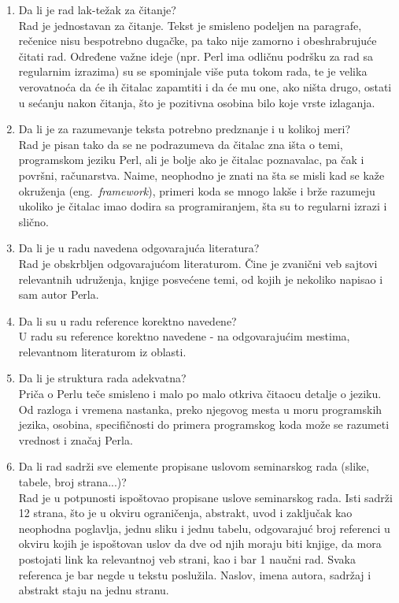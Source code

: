 \documentclass[a4paper]{report}
\begin{document}
\begin{enumerate}
\item Da li je rad lak-težak za čitanje?\\
Rad je jednostavan za čitanje. Tekst je smisleno podeljen na paragrafe, rečenice nisu bespotrebno dugačke, pa tako nije zamorno i obeshrabrujuće čitati rad. Određene važne ideje (npr. Perl ima odličnu podršku za rad sa regularnim izrazima) su se spominjale više puta tokom rada, te je velika verovatnoća da će ih čitalac zapamtiti i da će mu one, ako ništa drugo, ostati u sećanju nakon čitanja, što je pozitivna osobina bilo koje vrste izlaganja.
\item Da li je za razumevanje teksta potrebno predznanje i u kolikoj meri?\\
Rad je pisan tako da se ne podrazumeva da čitalac zna išta o temi, programskom jeziku Perl, ali je bolje ako je čitalac poznavalac, pa čak i površni, računarstva. Naime, neophodno je znati na šta se misli kad se kaže okruženja (eng.~{\em framework}), primeri koda se mnogo lakše i brže razumeju ukoliko je čitalac imao dodira sa programiranjem, šta su to regularni izrazi i slično.
\item Da li je u radu navedena odgovarajuća literatura?\\
Rad je obskrbljen odgovarajućom literaturom. Čine je zvanični veb sajtovi relevantnih udruženja, knjige posvećene temi, od kojih je nekoliko napisao i sam autor Perla.
\item Da li su u radu reference korektno navedene?\\
U radu su reference korektno navedene - na odgovarajućim mestima, relevantnom literaturom iz oblasti.
\item Da li je struktura rada adekvatna?\\
Priča o Perlu teče smisleno i malo po malo otkriva čitaocu detalje o jeziku. Od razloga i vremena nastanka, preko njegovog mesta u moru programskih jezika, osobina, specifičnosti do primera programskog koda može se razumeti vrednost i značaj Perla.
\item Da li rad sadrži sve elemente propisane uslovom seminarskog rada (slike, tabele, broj strana...)?\\
Rad je u potpunosti ispoštovao propisane uslove seminarskog rada.
Isti sadrži 12 strana, što je u okviru ograničenja, abstrakt, uvod i zaključak kao neophodna poglavlja, jednu sliku i jednu tabelu, odgovarajuć broj referenci u okviru kojih je ispoštovan uslov da dve od njih moraju biti knjige, da mora postojati link ka relevantnoj veb strani, kao i bar 1 naučni rad. Svaka referenca je bar negde u tekstu poslužila. Naslov, imena autora, sadržaj i abstrakt staju na jednu stranu.

\end{enumerate}
\end{document}
